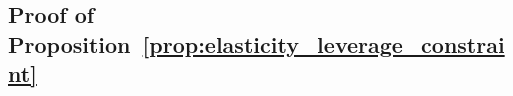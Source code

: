 \subsection{Proof of Proposition~\ref{prop:elasticity_leverage_constraint}}\label{app:prop_elasticity_leverage_constraint}
